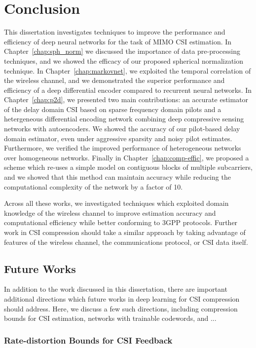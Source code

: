 \chapter{Conclusion} \label{chap:conclusion}

This dissertation investigates techniques to improve the performance and efficiency of deep neural networks for the task of MIMO CSI estimation. In Chapter~\ref{chap:sph_norm} we discussed the importance of data pre-processing techniques, and we showed the efficacy of our proposed spherical normalization technique. In Chapter~\ref{chap:markovnet}, we exploited the temporal correlation of the wireless channel, and we demonstrated the superior performance and efficiency of a deep differential encoder compared to recurrent neural networks. In Chapter~\ref{chap:p2d}, we presented two main contributions: an accurate estimator of the delay domain CSI based on sparse frequency domain pilots and a hetergeneous differential encoding network combining deep compressive sensing networks with autoencoders. We showed the accuracy of our pilot-based delay domain estimator, even under aggressive sparsity and noisy pilot estimates. Furthermore, we verified the improved performance of heterogeneous networks over homogeneous networks. Finally in Chapter~\ref{chap:comp-effic}, we proposed a scheme which re-uses a simple model on contiguous blocks of multiple subcarriers, and we showed that this method can maintain accuracy while reducing the computational complexity of the network by a factor of 10.  

Across all these works, we investigated techniques which exploited domain knowledge of the wireless channel to improve estimation accuracy and computational efficiency while better conforming to 3GPP protocols. Further work in CSI compression should take a similar approach by taking advantage of features of the wireless channel, the communications protocol, or CSI data itself.

\section{Future Works}

In addition to the work discussed in this dissertation, there are important additional directions which future works in deep learning for CSI compression should address. Here, we discuss a few such directions, including compression bounds for CSI estimation, networks with trainable codewords, and ...  

\subsection{Rate-distortion Bounds for CSI Feedback}

